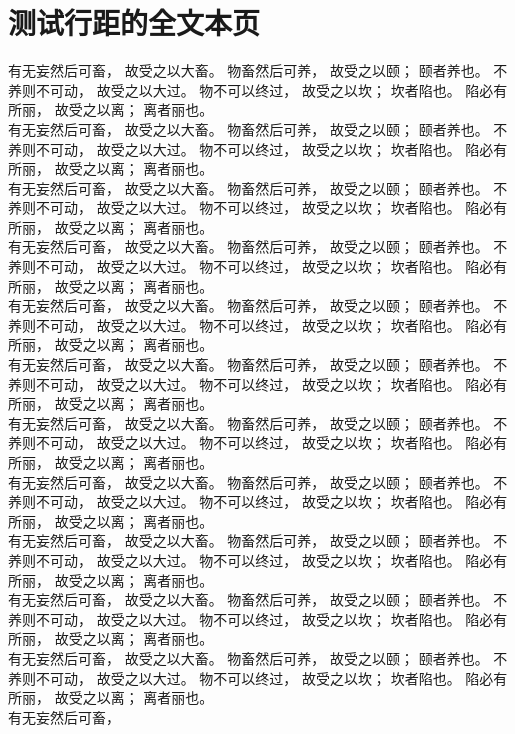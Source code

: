 \section{测试行距的全文本页}
有无妄然后可畜，
故受之以大畜。
物畜然后可养，
故受之以颐；
颐者养也。
不养则不可动，
故受之以大过。
物不可以终过，
故受之以坎；
坎者陷也。
陷必有所丽，
故受之以离；
离者丽也。\\
有无妄然后可畜，
故受之以大畜。
物畜然后可养，
故受之以颐；
颐者养也。
不养则不可动，
故受之以大过。
物不可以终过，
故受之以坎；
坎者陷也。
陷必有所丽，
故受之以离；
离者丽也。\\
有无妄然后可畜，
故受之以大畜。
物畜然后可养，
故受之以颐；
颐者养也。
不养则不可动，
故受之以大过。
物不可以终过，
故受之以坎；
坎者陷也。
陷必有所丽，
故受之以离；
离者丽也。\\
有无妄然后可畜，
故受之以大畜。
物畜然后可养，
故受之以颐；
颐者养也。
不养则不可动，
故受之以大过。
物不可以终过，
故受之以坎；
坎者陷也。
陷必有所丽，
故受之以离；
离者丽也。\\
有无妄然后可畜，
故受之以大畜。
物畜然后可养，
故受之以颐；
颐者养也。
不养则不可动，
故受之以大过。
物不可以终过，
故受之以坎；
坎者陷也。
陷必有所丽，
故受之以离；
离者丽也。\\
有无妄然后可畜，
故受之以大畜。
物畜然后可养，
故受之以颐；
颐者养也。
不养则不可动，
故受之以大过。
物不可以终过，
故受之以坎；
坎者陷也。
陷必有所丽，
故受之以离；
离者丽也。\\
有无妄然后可畜，
故受之以大畜。
物畜然后可养，
故受之以颐；
颐者养也。
不养则不可动，
故受之以大过。
物不可以终过，
故受之以坎；
坎者陷也。
陷必有所丽，
故受之以离；
离者丽也。\\
有无妄然后可畜，
故受之以大畜。
物畜然后可养，
故受之以颐；
颐者养也。
不养则不可动，
故受之以大过。
物不可以终过，
故受之以坎；
坎者陷也。
陷必有所丽，
故受之以离；
离者丽也。\\
有无妄然后可畜，
故受之以大畜。
物畜然后可养，
故受之以颐；
颐者养也。
不养则不可动，
故受之以大过。
物不可以终过，
故受之以坎；
坎者陷也。
陷必有所丽，
故受之以离；
离者丽也。\\
有无妄然后可畜，
故受之以大畜。
物畜然后可养，
故受之以颐；
颐者养也。
不养则不可动，
故受之以大过。
物不可以终过，
故受之以坎；
坎者陷也。
陷必有所丽，
故受之以离；
离者丽也。\\
有无妄然后可畜，
故受之以大畜。
物畜然后可养，
故受之以颐；
颐者养也。
不养则不可动，
故受之以大过。
物不可以终过，
故受之以坎；
坎者陷也。
陷必有所丽，
故受之以离；
离者丽也。\\
有无妄然后可畜，
